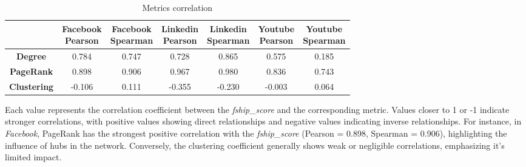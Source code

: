 \documentclass{article}
\begin{document}
\begin{table}[H]
    \centering
    \begin{tabular}{|c|c|c|c|c|c|c|}
        \hline
        & \makecell{Facebook \\ Pearson} & \makecell{Facebook \\ Spearman} & \makecell{Linkedin \\ Pearson}
         & \makecell{Linkedin \\ Spearman} & \makecell{Youtube \\ Pearson} & \makecell{Youtube \\ Spearman} \\ \hline
        \textbf{Degree} & 0.784 & 0.747   & 0.728             & 0.865           & 0.575           & 0.185       \\  \hline

        \textbf{PageRank} & 0.898 & 0.906 & 0.967 & 0.980 & 0.836 & 0.743 \\ \hline

        \textbf{Clustering} &  -0.106 &  0.111 & -0.355 & -0.230 & -0.003 & 0.064\\ \hline
    \end{tabular}
    \caption{Metrics correlation}
\end{table} 

Each value represents the correlation coefficient between the \textit{fship\_score} and the corresponding metric. Values closer to 1 or -1 indicate stronger correlations, with positive values showing direct relationships and negative values indicating inverse relationships.
For instance, in \textit{Facebook}, PageRank has the strongest positive correlation with the \textit{fship\_score} (Pearson = 0.898, Spearman = 0.906), highlighting the influence of hubs in the network. Conversely, the clustering coefficient generally shows weak or negligible correlations, emphasizing it's limited impact.
\end{document}
